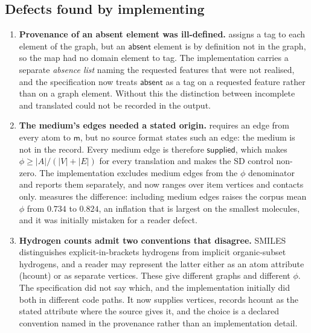 \documentclass[11pt,twocolumn,a4paper]{article}
\theoremstyle{msthm}
\theoremstyle{definition}
\theoremstyle{remark}
\newcommand{\V}{V}
\newcommand{\E}{E}
\newcommand{\med}{\mathsf{m}}
\newcommand{\abs}[1]{\lvert#1\rvert}
\newcommand{\supplied}{\textsf{supplied}}
\newcommand{\absent}{\textsf{absent}}
\begin{document}
\subsection{Defects found by implementing}
\label{sec:defects}

\begin{enumerate}[label=\textbf{D\arabic*.},leftmargin=2.8em,itemsep=4pt]
\item \textbf{Provenance of an absent element was ill-defined.}
 assigns a tag to each element of the graph, but an
$\absent$ element is by definition not in the graph, so the map had no
domain element to tag. The implementation carries a separate
\emph{absence list} naming the requested features that were not
realised, and the specification now treats $\absent$ as a tag on a
requested feature rather than on a graph element. Without this the
distinction between \textsf{incomplete} and \textsf{translated} could
not be recorded in the output.

\item \textbf{The medium's edges needed a stated origin.}
 requires an edge from every atom to $\med$, but no
source format states such an edge: the medium is not in the record.
Every medium edge is therefore $\supplied$, which makes $\phi\ge
\abs{A}/(\abs{\V}+\abs{\E})$ for every translation and makes the SD
control non-zero. The implementation excludes medium edges from the
$\phi$ denominator and reports them separately, and
 now ranges over item vertices and contacts only.
 measures the difference: including medium edges
raises the corpus mean $\phi$ from $0.734$ to $0.824$, an inflation
that is largest on the smallest molecules, and it was initially mistaken
for a reader defect.

\item \textbf{Hydrogen counts admit two conventions that disagree.}
SMILES distinguishes explicit-in-brackets hydrogens from implicit
organic-subset hydrogens, and a reader may represent the latter either
as an atom attribute (\textsf{hcount}) or as separate vertices. These
give different graphs and different $\phi$. The specification did not
say which, and the implementation initially did both in different code
paths. It now supplies vertices, records \textsf{hcount} as the stated
attribute where the source gives it, and the choice is a declared
convention named in the provenance rather than an implementation
detail.


\end{enumerate}
\end{document}
